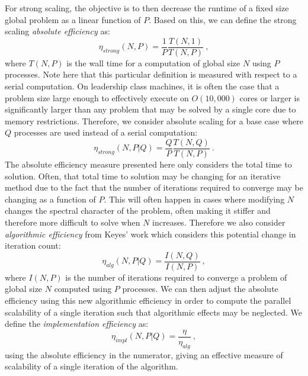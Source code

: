 For strong scaling, the objective is to then decrease the runtime of a
fixed size global problem as a linear function of $P$. Based on this,
we can define the strong scaling \textit{absolute efficiency} as:
\begin{equation}
  \eta_{strong}(N,P) = \frac{1}{P} \frac{T(N,1)}{T(N,P)}\:,
  \label{eq:strong_scaling_absolute}
\end{equation}
where $T(N,P)$ is the wall time for a computation of global size $N$
using $P$ processes. Note here that this particular definition is
measured with respect to a serial computation. On leadership class
machines, it is often the case that a problem size large enough to
effectively execute on $O(10,000)$ cores or larger is significantly
larger than any problem that may be solved by a single core due to
memory restrictions. Therefore, we consider absolute scaling for a
base case where $Q$ processes are used instead of a serial
computation:
\begin{equation}
  \eta_{strong}(N,P|Q) = \frac{Q}{P} \frac{T(N,Q)}{T(N,P)}\:.
  \label{eq:strong_scaling_absolute_ref}
\end{equation}
The absolute efficiency measure presented here only considers the
total time to solution. Often, that total time to solution may be
changing for an iterative method due to the fact that the number of
iterations required to converge may be changing as a function of
$P$. This will often happen in cases where modifying $N$ changes the
spectral character of the problem, often making it stiffer and
therefore more difficult to solve when $N$ increases. Therefore we
also consider \textit{algorithmic efficiency} from Keyes' work which
considers this potential change in iteration count:
\begin{equation}
  \eta_{alg}(N,P|Q) = \frac{I(N,Q)}{I(N,P)}\:,
  \label{eq:algorithmic_efficiency}
\end{equation}
where $I(N,P)$ is the number of iterations required to converge a
problem of global size $N$ computed using $P$ processes. We can then
adjust the absolute efficiency using this new algorithmic efficiency
in order to compute the parallel scalability of a single iteration
such that algorithmic effects may be neglected. We define the
\textit{implementation efficiency} as:
\begin{equation}
  \eta_{impl}(N,P|Q) = \frac{\eta}{\eta_{alg}}\:,
  \label{eq:implementation_efficiency}
\end{equation}
using the absolute efficiency in the numerator, giving an effective
measure of scalability of a single iteration of the algorithm.


